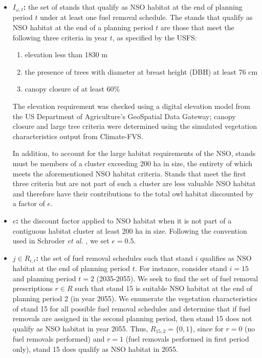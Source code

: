 \begin{itemize}
\item \textbf{$I_{\omega,t}$:} the set of stands that qualify as NSO habitat at the end of planning period $t$ under at least one fuel removal schedule. The stands that qualify as NSO habitat at the end of a planning period $t$ are those that meet the following three criteria in year $t$, as specified by the USFS:
	\begin{enumerate}
	\item elevation less than 1830 m
	\item the presence of trees with diameter at breast height (DBH) at least 76 cm
	\item canopy closure of at least 60\%
	\end{enumerate}
The elevation requirement was checked using a digital elevation model from the US Department of Agriculture's GeoSpatial Data Gateway; canopy closure and large tree criteria were determined using the simulated vegetation characteristics output from Climate-FVS.

In addition, to account for the large habitat requirements of the NSO, stands must be members of a cluster exceeding 200 ha in size, the entirety of which meets the aforementioned NSO habitat criteria. Stands that meet the first three criteria but are not part of such a cluster are less valuable NSO habitat and therefore have their contributions to the total owl habitat discounted by a factor of $e$.

\item \textbf{$e$:} the discount factor applied to NSO habitat when it is not part of a contiguous habitat cluster at least 200 ha in size. Following the convention used in Schroder \textit{et al.} \cite{schroder2016multi}, we set $e = 0.5$.

\item \textbf{$j \in R_{i,t}$:} the set of fuel removal schedules such that stand $i$ qualifies as NSO habitat at the end of planning period $t$. For instance, consider stand $i=15$ and planning period $t=2$ (2035-2055). We seek to find the set of fuel removal prescriptions $r \in R$ such that stand 15 is suitable NSO habitat at the end of planning period 2 (in year 2055). We enumerate the vegetation characteristics of stand 15 for all possible fuel removal schedules and determine that if fuel removals are assigned in the second planning period, then stand 15 does not qualify as NSO habitat in year 2055. Thus, $R_{15,2} = \{0,1\}$, since for $r=0$ (no fuel removals performed) and $r=1$ (fuel removals performed in first period only), stand 15 does qualify as NSO habitat in 2055.


\end{itemize}
